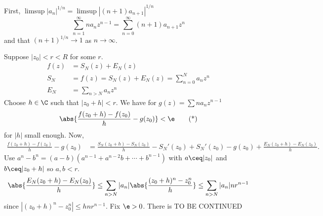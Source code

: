 \documentclass[class=article, crop=false]{standalone}
\begin{document}
First, $\limsup |a_n|^{1/n} = \limsup |(n+1)a_{n+1}|^{1/n}$
  \[
    \sum_{n=1}^{\infty} na_nz^{n-1} = \sum_{n=0}^{\infty} (n+1)a_{n+1} z^n
  \]
and that $(n+1)^{1/n} \to 1$ as $n \to \infty$.

Suppose $|z_0| < r <R$ for some $r$.
  \begin{align*}
    f(z) &= S_N(z) + E_N(z) \\
    S_N &= f(z) = S_N(z) + E_N(z) = \sum_{n=0}^{N} a_nz^n \\
    E_N &= \sum_{n>N}^{} a_nz^n
  \end{align*}
Choose $h \in \C$ such that $|z_0+h| < r$. We have for $g(z) = \sum na_nz^{n-1}$
  \[
    \abs{\frac{f(z_0+h)-f(z_0)}{h} - g(z_0)} < \e \tag{*}
  \]
for $|h|$ small enough. Now,
  \begin{align*}
    \frac{f(z_0+h)-f(z_0)}{h} - g(z_0) &= \frac{S_N(z_0+h)-S_N(z_0)}{h} - S_N'(z_0) + S_N'(z_0) - g(z_0) + \frac{E_N(z_0+h)-E_N(z_0)}{h}.
  \end{align*}
Use $a^n-b^n = (a-b)(a^{n-1}+a^{n-2}b + \cdots + b^{n-1}) $ with $a \ceq |z_0|$ and $b\ceq |z_0+h|$ so $a,b <r$.
  \[
    \abs{\frac{E_N(z_0+h) - E_N(z_0)}{h}} \leq \sum_{n > N}^{} |a_n| \abs{\frac{(z_0+h)^n - z_0^n}{h}} \leq \sum_{n > N}^{} |a_n|nr^{n-1}
  \]
since $|(z_0+h)^n - z_0^n| \leq hnr^{n-1}$. Fix $\e > 0$. There is TO BE CONTINUED
\end{document}
